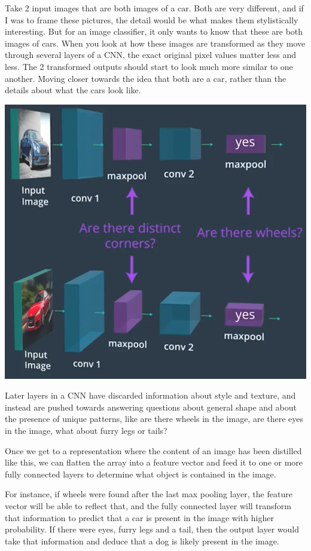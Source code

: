 Take 2 input images that are both images of a car. Both are very different, and if I was to frame these pictures, the detail would be what makes them stylistically interesting. But for an image classifier, it only wants to know that these are both images of cars. When you look at how these images are transformed as they move through several layers of a CNN, the exact original pixel values matter less and less. The 2 transformed outputs should start to look much more similar to one another. Moving closer towards the idea that both are a car, rather than the details about what the cars look like.

\includegraphics[width=1\linewidth]{img//cnn//depth/imagecar2.png}

Later layers in a CNN have discarded information about style and texture, and instead are pushed towards answering questions about general shape and about the presence of unique patterns,
like are there wheels in the image, are there eyes in the image, what about furry legs or tails? \newline

Once we get to a representation where the content of an image has been distilled like this,
we can flatten the array into a feature vector and feed it to one or more fully connected layers to determine what object is contained in the image.\newline

For instance, if wheels were found after the last max pooling layer, the feature vector will be able to reflect that, and the fully connected layer will transform that information to predict that a car is present in the image with higher probability.
If there were eyes, furry legs and a tail, then the output layer would take that information and deduce that a dog is likely present in the image.\newline

